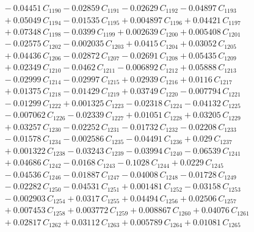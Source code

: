 \documentclass[a4paper,11pt]{article}
\begin{document}
\begin{align}
&\quad - 0.04451\,C_{1190} - 0.02859\,C_{1191} - 0.02629\,C_{1192} - 0.04897\,C_{1193} \nonumber\\
&\quad + 0.05049\,C_{1194} - 0.01535\,C_{1195} + 0.004897\,C_{1196} + 0.04421\,C_{1197} \nonumber\\
&\quad + 0.07348\,C_{1198} - 0.0399\,C_{1199} + 0.002639\,C_{1200} + 0.005408\,C_{1201} \nonumber\\
&\quad - 0.02575\,C_{1202} - 0.002035\,C_{1203} + 0.0415\,C_{1204} + 0.03052\,C_{1205} \nonumber\\
&\quad + 0.04436\,C_{1206} - 0.02872\,C_{1207} - 0.02691\,C_{1208} + 0.05435\,C_{1209} \nonumber\\
&\quad + 0.02349\,C_{1210} - 0.0462\,C_{1211} - 0.006892\,C_{1212} + 0.05888\,C_{1213} \nonumber\\
&\quad - 0.02999\,C_{1214} - 0.02997\,C_{1215} + 0.02939\,C_{1216} + 0.0116\,C_{1217} \nonumber\\
&\quad + 0.01375\,C_{1218} - 0.01429\,C_{1219} + 0.03749\,C_{1220} - 0.007794\,C_{1221} \nonumber\\
&\quad - 0.01299\,C_{1222} + 0.001325\,C_{1223} - 0.02318\,C_{1224} - 0.04132\,C_{1225} \nonumber\\
&\quad - 0.007062\,C_{1226} - 0.02339\,C_{1227} + 0.01051\,C_{1228} + 0.03205\,C_{1229} \nonumber\\
&\quad + 0.03257\,C_{1230} - 0.02252\,C_{1231} - 0.01732\,C_{1232} - 0.02208\,C_{1233} \nonumber\\
&\quad - 0.01578\,C_{1234} - 0.002586\,C_{1235} - 0.04491\,C_{1236} + 0.029\,C_{1237} \nonumber\\
&\quad + 0.001322\,C_{1238} - 0.03243\,C_{1239} - 0.03994\,C_{1240} - 0.06539\,C_{1241} \nonumber\\
&\quad + 0.04686\,C_{1242} - 0.0168\,C_{1243} - 0.1028\,C_{1244} + 0.0229\,C_{1245} \nonumber\\
&\quad - 0.04536\,C_{1246} - 0.01887\,C_{1247} - 0.04008\,C_{1248} - 0.01728\,C_{1249} \nonumber\\
&\quad - 0.02282\,C_{1250} - 0.04531\,C_{1251} + 0.001481\,C_{1252} - 0.03158\,C_{1253} \nonumber\\
&\quad - 0.002903\,C_{1254} + 0.0317\,C_{1255} + 0.04494\,C_{1256} + 0.02506\,C_{1257} \nonumber\\
&\quad + 0.007453\,C_{1258} + 0.003772\,C_{1259} + 0.008867\,C_{1260} + 0.04076\,C_{1261} \nonumber\\
&\quad + 0.02817\,C_{1262} + 0.03112\,C_{1263} + 0.005789\,C_{1264} + 0.01081\,C_{1265} \nonumber\\

\end{align}
\end{document}
